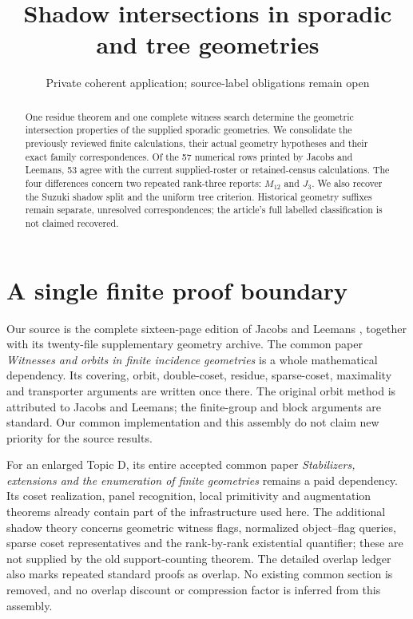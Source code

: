 \documentclass[11pt,a4paper]{article}
\title{Shadow intersections in sporadic and tree geometries}
\author{Private coherent application; source-label obligations remain open}
\date{}
\begin{document}
\maketitle
\begin{abstract}
One residue theorem and one complete witness search determine the
geometric intersection properties of the supplied sporadic geometries.
We consolidate the previously reviewed finite calculations, their actual
geometry hypotheses and their exact family correspondences. Of the
57 numerical rows printed by Jacobs and Leemans, 53 agree with the
current supplied-roster or retained-census calculations. The four
differences concern two repeated rank-three reports: $M_{12}$ and $J_3$.
We also recover the Suzuki shadow split and the uniform tree criterion.
Historical geometry suffixes remain separate, unresolved correspondences;
the article's full labelled classification is not claimed recovered.
\end{abstract}

\section{A single finite proof boundary}
Our source is the complete sixteen-page edition of Jacobs and Leemans
\cite{jl}, together with its twenty-file supplementary geometry archive.
The common paper \emph{Witnesses and orbits in finite incidence geometries}
is a whole mathematical dependency. Its covering, orbit, double-coset,
residue, sparse-coset, maximality and transporter arguments are written
once there. The original orbit method is attributed to Jacobs and
Leemans; the finite-group and block arguments are standard. Our common
implementation and this assembly do not claim new priority for the
source results.

For an enlarged Topic D, its entire accepted common paper
\emph{Stabilizers, extensions and the enumeration of finite geometries}
remains a paid dependency. Its coset realization, panel recognition,
local primitivity and augmentation theorems already contain part of
the infrastructure used here. The additional shadow theory concerns
geometric witness flags, normalized object--flag queries, sparse coset
representatives and the rank-by-rank existential quantifier; these are
not supplied by the old support-counting theorem. The detailed overlap
ledger also marks repeated standard proofs as overlap. No existing
common section is removed, and no overlap discount or compression
factor is inferred from this assembly.
\end{document}
